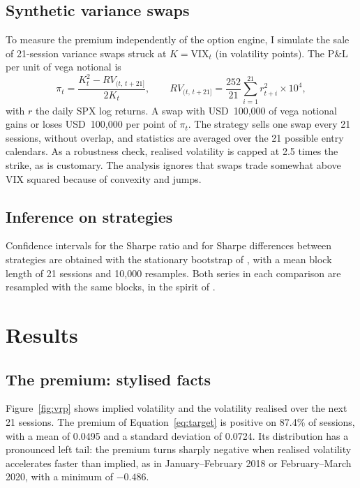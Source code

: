 \documentclass[11pt,a4paper]{article}
\begin{document}
\subsection{Synthetic variance swaps}\label{sec:method_vs}

To measure the premium independently of the option engine, I simulate the sale of 21-session variance swaps struck at $K=\text{VIX}_t$ (in volatility points). The P\&L per unit of vega notional is
\begin{equation}\label{eq:vswap}
  \pi_t = \frac{K_t^2 - RV_{(t,\,t+21]}}{2K_t},
  \qquad RV_{(t,\,t+21]} = \frac{252}{21}\sum_{i=1}^{21} r_{t+i}^2 \times 10^4,
\end{equation}
with $r$ the daily SPX log returns. A swap with USD~100,000 of vega notional gains or loses USD~100,000 per point of $\pi_t$. The strategy sells one swap every 21 sessions, without overlap, and statistics are averaged over the 21 possible entry calendars. As a robustness check, realised volatility is capped at 2.5 times the strike, as is customary. The analysis ignores that swaps trade somewhat above VIX squared because of convexity and jumps.

\subsection{Inference on strategies}

Confidence intervals for the Sharpe ratio and for Sharpe differences between strategies are obtained with the stationary bootstrap of \citet{politisromano1994}, with a mean block length of 21 sessions and 10,000 resamples. Both series in each comparison are resampled with the same blocks, in the spirit of \citet{ledoitwolf2008}.

\section{Results}\label{sec:results}

\subsection{The premium: stylised facts}

Figure~\ref{fig:vrp} shows implied volatility and the volatility realised over the next 21 sessions. The premium of Equation~\eqref{eq:target} is positive on 87.4\% of sessions, with a mean of 0.0495 and a standard deviation of 0.0724. Its distribution has a pronounced left tail: the premium turns sharply negative when realised volatility accelerates faster than implied, as in January--February 2018 or February--March 2020, with a minimum of $-0.486$.
\end{document}
